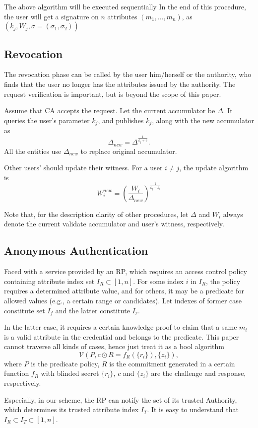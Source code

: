 \documentclass[journal]{IEEEtran}
\begin{document}
The above algorithm will be executed sequentially In the end of this procedure, the user will get a signature on $n$ attributes $(m_1,\dots, m_n)$, as $(k_j, W_j, \sigma=(\sigma_1, \sigma_2))$

\subsection{Revocation}
The revocation phase can be called by the user him/herself or the authority, who finds that the user no longer has the attributes issued by the authority. The request verification is important, but is beyond the scope of this paper. 

Assume that CA accepts the request. Let the current accumulator be $\Delta$. It queries the user's parameter $k_j$, and publishes $k_j$, along with the new accumulator as $$\Delta_{new} = \Delta^{\frac{1}{k_j + \gamma}}.$$ All the entities use $\Delta_{new}$ to replace original accumulator. 

Other users' should update their witness. For a user $i\neq j$, the update algorithm is 
$$W_i^{new} = (\frac{W_i}{\Delta_{new}})^{\frac{1}{k_j-k_i}}$$

Note that, for the description clarity of other procedures, let $\Delta$ and $W_i$ always denote the current validate accumulator and user's witness, respectively. 
	
	
\subsection{Anonymous Authentication}
Faced with a service provided by an RP, which requires an access control policy containing attribute index set $I_R\subset [1, n]$. For some index $i$ in $I_R$, the policy requires a determined attribute value, and for others, it may be a predicate for allowed values (e.g., a certain range or candidates).  Let indexes of former case constitute set $I_f$ and the latter constitute $I_r$. 

In the latter case, it requires a certain knowledge proof to claim that a same $m_i$ is a valid attribute in the credential and belongs to the predicate. This paper cannot traverse all kinds of cases, hence just treat it as a bool algorithm 
$$\mathcal{V}(P, c\odot R=f_R(\{r_i\}), \{z_i\}),$$
where $P$ is the predicate policy, $R$ is the commitment generated in a certain function $f_R$ with blinded secret $\{r_i\}$, $c$ and $\{z_i\}$ are the challenge and response, respectively.

Especially, in our scheme, the RP can notify the set of its trusted Authority, which determines its trusted attribute index $I_T$. It is easy to understand that $I_R\subset I_T \subset [1, n]$. 
\end{document}
